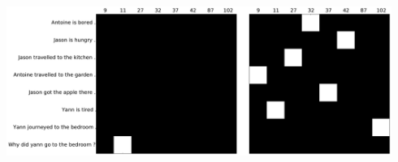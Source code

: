\documentclass[landscape,a0paper,fontscale=0.285,final]{baposter} %
\begin{document}
\begin{poster}
{\begin{minipage}[t]{0.95\linewidth}
\centering
\includegraphics[width=0.94\textwidth]{ntm_grucontroller_task20_ntm_ex5_hard}
\end{minipage}
}





\end{poster}
\end{document}

